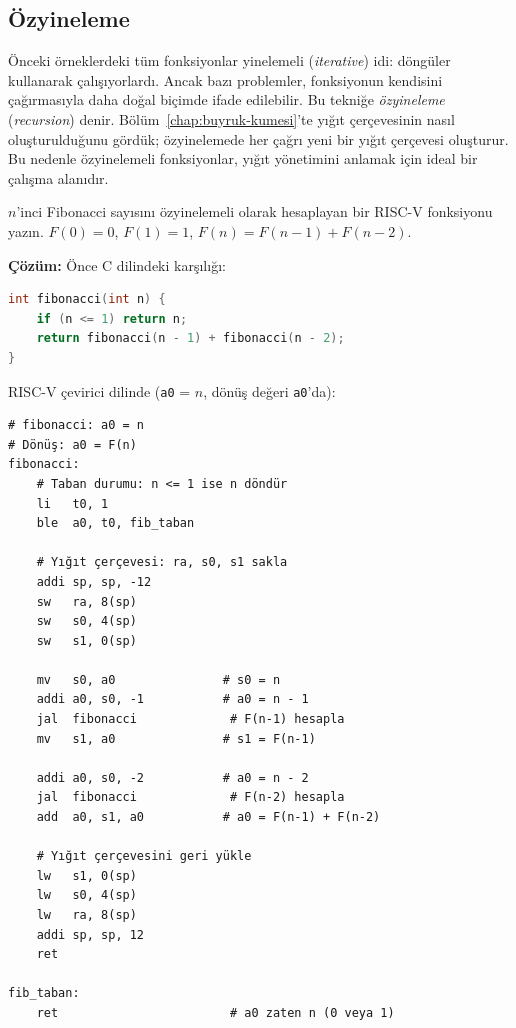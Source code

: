 \subsection{Özyineleme}
\label{subsec:ozyineleme}

Önceki örneklerdeki tüm fonksiyonlar yinelemeli (\emph{iterative}) idi: döngüler kullanarak çalışıyorlardı. Ancak bazı problemler, fonksiyonun kendisini çağırmasıyla daha doğal biçimde ifade edilebilir. Bu tekniğe \emph{özyineleme} (\emph{recursion}) denir. Bölüm~\ref{chap:buyruk-kumesi}'te yığıt çerçevesinin nasıl oluşturulduğunu gördük; özyinelemede her çağrı yeni bir yığıt çerçevesi oluşturur. Bu nedenle özyinelemeli fonksiyonlar, yığıt yönetimini anlamak için ideal bir çalışma alanıdır.

\begin{ornek}[4.14]
\label{orn:fibonacci}
$n$'inci Fibonacci sayısını özyinelemeli olarak hesaplayan bir RISC-V fonksiyonu yazın. $F(0) = 0$, $F(1) = 1$, $F(n) = F(n-1) + F(n-2)$.

\textbf{Çözüm:} Önce C dilindeki karşılığı:

\begin{lstlisting}[language=C, style=alistirma-kod]
int fibonacci(int n) {
    if (n <= 1) return n;
    return fibonacci(n - 1) + fibonacci(n - 2);
}
\end{lstlisting}

RISC-V çevirici dilinde (\texttt{a0} = $n$, dönüş değeri \texttt{a0}'da):

\begin{lstlisting}[style=riscv]
# fibonacci: a0 = n
# Dönüş: a0 = F(n)
fibonacci:
    # Taban durumu: n <= 1 ise n döndür
    li   t0, 1
    ble  a0, t0, fib_taban

    # Yığıt çerçevesi: ra, s0, s1 sakla
    addi sp, sp, -12
    sw   ra, 8(sp)
    sw   s0, 4(sp)
    sw   s1, 0(sp)

    mv   s0, a0               # s0 = n
    addi a0, s0, -1           # a0 = n - 1
    jal  fibonacci             # F(n-1) hesapla
    mv   s1, a0               # s1 = F(n-1)

    addi a0, s0, -2           # a0 = n - 2
    jal  fibonacci             # F(n-2) hesapla
    add  a0, s1, a0           # a0 = F(n-1) + F(n-2)

    # Yığıt çerçevesini geri yükle
    lw   s1, 0(sp)
    lw   s0, 4(sp)
    lw   ra, 8(sp)
    addi sp, sp, 12
    ret

fib_taban:
    ret                        # a0 zaten n (0 veya 1)
\end{lstlisting}


\end{ornek}
